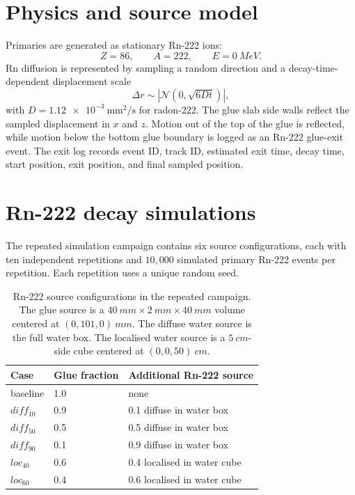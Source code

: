 \documentclass[11pt,a4paper]{article}
\begin{document}
\section{Physics and source model}

Primaries are generated as stationary Rn-222 ions:
\[
  Z=86, \qquad A=222, \qquad E=\SI{0}{MeV}.
\]
Rn diffusion is represented by sampling a random direction and a
decay-time-dependent displacement scale
\[
  \Delta r \sim \left| \mathcal{N}\left(0, \sqrt{6Dt}\right) \right|,
\]
with \(D=\SI{1.12e-3}{\milli\metre\squared\per\second}\) for radon-222.
The glue slab side walls reflect the sampled displacement in \(x\) and
\(z\).  Motion out of the top of the glue is reflected, while motion below
the bottom glue boundary is logged as an Rn-222 glue-exit event.  The exit
log records event ID, track ID, estimated exit time, decay time, start
position, exit position, and final sampled position.

\section{Rn-222 decay simulations}

The repeated simulation campaign contains six source configurations, each with ten
independent repetitions and \(10{,}000\) simulated primary Rn-222 events per
repetition.  Each repetition uses a unique random seed.

\begin{table}[h]
\centering
\caption{Rn-222 source configurations in the repeated campaign.  The glue
source is a \(\SI{40}{mm} \times \SI{2}{mm} \times \SI{40}{mm}\) volume
centered at \((0,101,0)~\si{mm}\).  The diffuse water source is the full
water box.  The localised water source is a \(\SI{5}{cm}\)-side cube
centered at \((0,0,50)~\si{cm}\).}
\begin{tabular}{lll}
\toprule
Case & Glue fraction & Additional Rn-222 source \\
\midrule
baseline & 1.0 & none \\
$diff_{10}$ & 0.9 & 0.1 diffuse in water box \\
$diff_{50}$ & 0.5 & 0.5 diffuse in water box \\
$diff_{90}$ & 0.1 & 0.9 diffuse in water box \\
$loc_{40}$ & 0.6 & 0.4 localised in water cube \\
$loc_{60}$ & 0.4 & 0.6 localised in water cube \\
\bottomrule
\end{tabular}
\end{table}
\end{document}
